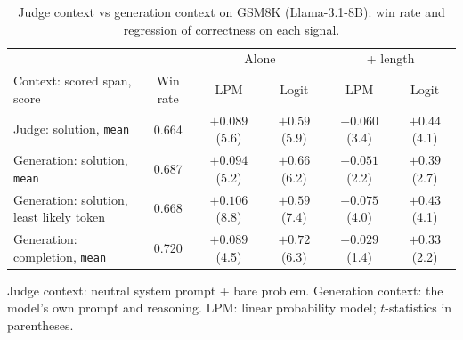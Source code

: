 \begin{table}[H]
\centering
\caption{Judge context vs generation context on GSM8K (Llama-3.1-8B): win rate and regression of correctness on each signal.}
\label{tab:context-gsm8k}
\begin{threeparttable}
\setlength{\tabcolsep}{3pt}
\begin{tabular}{lccccc}
\toprule
 & & \multicolumn{2}{c}{Alone} & \multicolumn{2}{c}{+ length} \\
\cmidrule(lr){3-4} \cmidrule(lr){5-6}
Context: scored span, score & Win rate & LPM & Logit & LPM & Logit \\
\midrule
Judge: solution, \texttt{mean} & 0.664 & $+0.089$ (5.6) & $+0.59$ (5.9) & $+0.060$ (3.4) & $+0.44$ (4.1) \\
Generation: solution, \texttt{mean} & 0.687 & $+0.094$ (5.2) & $+0.66$ (6.2) & $+0.051$ (2.2) & $+0.39$ (2.7) \\
\makecell[l]{Generation: solution,\\ least likely token} & 0.668 & $+0.106$ (8.8) & $+0.59$ (7.4) & $+0.075$ (4.0) & $+0.43$ (4.1) \\
Generation: completion, \texttt{mean} & 0.720 & $+0.089$ (4.5) & $+0.72$ (6.3) & $+0.029$ (1.4) & $+0.33$ (2.2) \\
\bottomrule
\end{tabular}
\begin{tablenotes}\footnotesize
\item Judge context: neutral system prompt + bare problem. Generation context: the model's own prompt and reasoning. LPM: linear probability model; $t$-statistics in parentheses.
\end{tablenotes}
\end{threeparttable}
\end{table}
